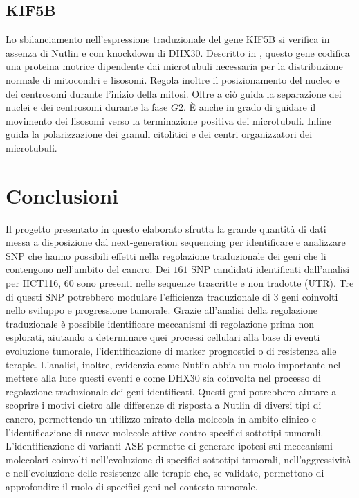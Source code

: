 	\subsection{KIF5B}
	Lo sbilanciamento nell'espressione traduzionale del gene KIF5B si verifica in assenza di Nutlin e con knockdown di DHX30.
	Descritto in \cite{kif5b}, questo gene codifica una proteina motrice dipendente dai microtubuli necessaria per la distribuzione normale di mitocondri e lisosomi.
	Regola inoltre il posizionamento del nucleo e dei centrosomi durante l'inizio della mitosi.
	Oltre a ci\`o guida la separazione dei nuclei e dei centrosomi durante la fase $G2$.
	\`E anche in grado di guidare il movimento dei lisosomi verso la terminazione positiva dei microtubuli.
	Infine guida la polarizzazione dei granuli citolitici e dei centri organizzatori dei microtubuli.

\section{Conclusioni}
\label{sec:ending}
Il progetto presentato in questo elaborato sfrutta la grande quantit\`a di dati messa a disposizione dal next-generation sequencing per identificare e analizzare SNP che hanno possibili effetti nella regolazione traduzionale dei geni che li contengono nell’ambito del cancro. 
Dei $161$ SNP candidati identificati dall'analisi per HCT116, $60$ sono presenti nelle sequenze trascritte e non tradotte (UTR).
Tre di questi SNP potrebbero modulare l'efficienza traduzionale di $3$ geni coinvolti nello sviluppo e progressione tumorale.
Grazie all’analisi della regolazione traduzionale \`e possibile identificare meccanismi di regolazione prima non esplorati, aiutando a determinare quei processi cellulari alla base di eventi evoluzione tumorale, l'identificazione di marker prognostici o di resistenza alle terapie.
L'analisi, inoltre, evidenzia come Nutlin abbia un ruolo importante nel mettere alla luce questi eventi e come DHX30 sia coinvolta nel processo di regolazione traduzionale dei geni identificati. 
Questi geni potrebbero aiutare a scoprire i motivi dietro alle differenze di risposta a Nutlin di diversi tipi di cancro, permettendo un utilizzo mirato della molecola in ambito clinico e l'identificazione di nuove molecole attive contro specifici sottotipi tumorali.
L'identificazione di varianti ASE permette di generare ipotesi sui meccanismi molecolari coinvolti nell'evoluzione di specifici sottotipi tumorali, nell'aggressivit\`a e nell'evoluzione delle resistenze alle terapie che, se validate, permettono di approfondire il ruolo di specifici geni nel contesto tumorale. 
